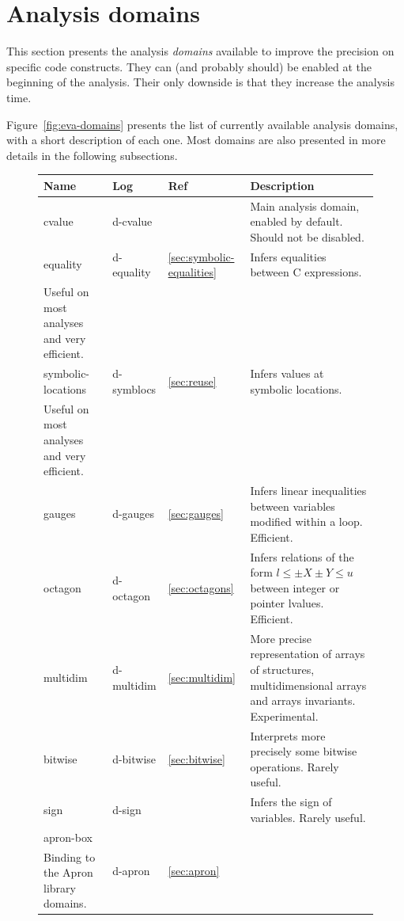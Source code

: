 \documentclass{frama-c-book}
\begin{document}
\section{Analysis domains}
\label{sec:eva}

This section presents the analysis \emph{domains}
available to improve the precision on specific code constructs.
They can (and probably should) be enabled at the beginning of the analysis.
Their only downside is that they increase the analysis time.

Figure~\ref{fig:eva-domains} presents the list of currently available analysis
domains, with a short description of each one.
Most domains are also presented in more details in the following subsections.

\begin{figure}
  \begin{tabular}{lll>{\raggedright}m{7.5cm}}
    Name & Log & Ref & Description\tabularnewline
    \midrule
    \midrule
    cvalue & d-cvalue &  &
    Main analysis domain, enabled by default. Should not be disabled.
    \tabularnewline
    \midrule
    equality & d-equality & \ref{sec:symbolic-equalities} &
    Infers equalities between C expressions. \\
    Useful on most analyses and very efficient.
    \tabularnewline
    \midrule
    symbolic-locations & d-symblocs & \ref{sec:reuse} &
    Infers values at symbolic locations. \\
    Useful on most analyses and very efficient.
    \tabularnewline
    \midrule
    gauges & d-gauges & \ref{sec:gauges} &
    Infers linear inequalities between variables modified within a loop. Efficient.
    \tabularnewline
    \midrule
    octagon & d-octagon & \ref{sec:octagons} &
    Infers relations of the form $l \leq \pm X \pm Y \leq u$ between integer or
    pointer lvalues. Efficient.
    \tabularnewline
    \midrule
    multidim & d-multidim & \ref{sec:multidim} &
    More precise representation of arrays of structures,
    multidimensional arrays and arrays invariants.
    Experimental.
    \tabularnewline
    \midrule
    bitwise & d-bitwise & \ref{sec:bitwise} &
    Interprets more precisely some bitwise operations. Rarely useful.
    \tabularnewline
    \midrule
    sign & d-sign &  &
    Infers the sign of variables. Rarely useful.
    \tabularnewline
    \midrule
    apron-box & \multirow{5}{*}{d-apron} & \multirow{5}{*}{\ref{sec:apron}} &
    \multirow{5}{7.5cm}{Experimental and often costly. \\
      Binding to the Apron library domains.}\tabularnewline

\end{tabular}
\end{figure}
\end{document}
